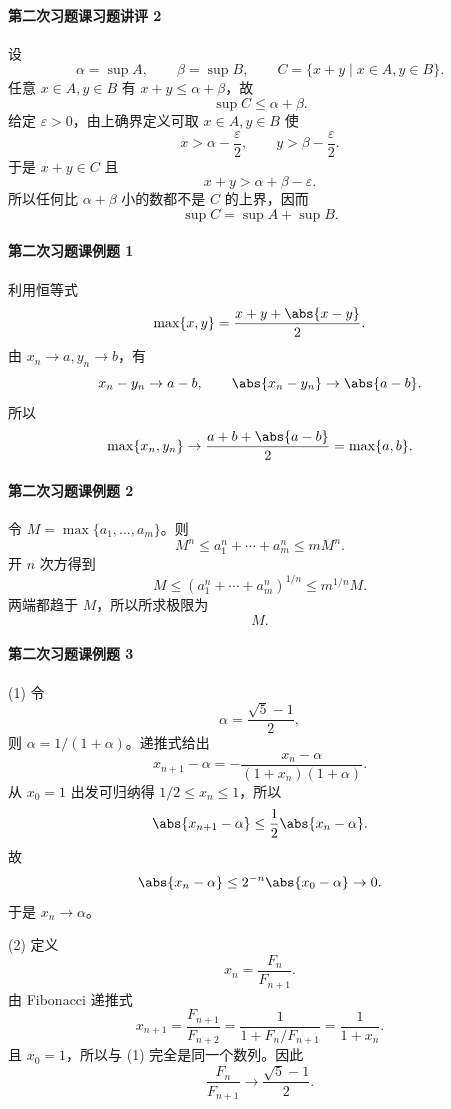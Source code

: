 \paragraph{第二次习题课习题讲评 2}
\begin{xsolution}
设
\[
  \alpha=\sup A,\qquad\beta=\sup B,
  \qquad C=\{x+y\mid x\in A,y\in B\}.
\]
任意 $x\in A,y\in B$ 有 $x+y\le\alpha+\beta$，故
\[
  \sup C\le\alpha+\beta.
\]
给定 $\varepsilon>0$，由上确界定义可取 $x\in A,y\in B$ 使
\[
  x>\alpha-\frac\varepsilon2,
  \qquad y>\beta-\frac\varepsilon2.
\]
于是 $x+y\in C$ 且
\[
  x+y>\alpha+\beta-\varepsilon.
\]
所以任何比 $\alpha+\beta$ 小的数都不是 $C$ 的上界，因而
\[
  \boxed{\sup C=\sup A+\sup B}.
\]
\end{xsolution}

\paragraph{第二次习题课例题 1}
\begin{xsolution}
利用恒等式
\[
  \max\{x,y\}=\frac{x+y+\abs{x-y}}2.
\]
由 $x_n\to a,y_n\to b$，有
\[
  x_n-y_n\to a-b,
  \qquad
  \abs{x_n-y_n}\to\abs{a-b}.
\]
所以
\[
  \max\{x_n,y_n\}
  \to\frac{a+b+\abs{a-b}}2
  =\max\{a,b\}.
\]
\end{xsolution}

\paragraph{第二次习题课例题 2}
\begin{xsolution}
令 $M=\max\{a_1,\ldots,a_m\}$。则
\[
  M^n\le a_1^n+\cdots+a_m^n\le mM^n.
\]
开 $n$ 次方得到
\[
  M\le(a_1^n+\cdots+a_m^n)^{1/n}\le m^{1/n}M.
\]
两端都趋于 $M$，所以所求极限为
\[
  \boxed{M}.
\]
\end{xsolution}

\paragraph{第二次习题课例题 3}
\begin{xsolution}
(1) 令
\[
  \alpha=\frac{\sqrt5-1}{2},
\]
则 $\alpha=1/(1+\alpha)$。递推式给出
\[
  x_{n+1}-\alpha
  =-\frac{x_n-\alpha}{(1+x_n)(1+\alpha)}.
\]
从 $x_0=1$ 出发可归纳得 $1/2\le x_n\le1$，所以
\[
  \abs{x_{n+1}-\alpha}\le\frac12\abs{x_n-\alpha}.
\]
故
\[
  \abs{x_n-\alpha}\le2^{-n}\abs{x_0-\alpha}\to0.
\]
于是 $x_n\to\alpha$。

(2) 定义
\[
  x_n=\frac{F_n}{F_{n+1}}.
\]
由 Fibonacci 递推式
\[
  x_{n+1}=\frac{F_{n+1}}{F_{n+2}}
  =\frac1{1+F_n/F_{n+1}}
  =\frac1{1+x_n}.
\]
且 $x_0=1$，所以与 (1) 完全是同一个数列。因此
\[
  \boxed{\frac{F_n}{F_{n+1}}\to\frac{\sqrt5-1}{2}}.
\]
\end{xsolution}

